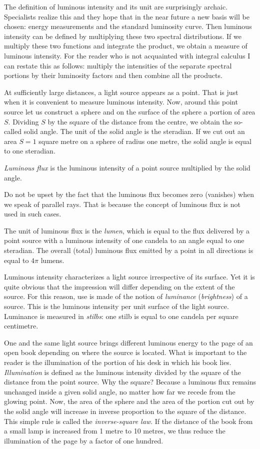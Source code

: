 The definition of luminous intensity and its unit are surprisingly archaic. Specialists realize this and they hope that in the near future a new basis will be chosen: energy measurements and the standard luminosity curve. Then luminous intensity can be defined by multiplying these two spectral distributions. If we multiply these two func­tions and integrate the product, we obtain a measure of luminous intensity. For the reader who is not acquainted with integral calculus I can restate this as follows: multiply the intensities of the separate spectral portions by their luminosity factors and then combine all the products.

At sufficiently large distances, a light source appears as a point. That is just when it is convenient to measure luminous intensity. Now, around this point source let us construct a sphere and on the surface of the sphere a portion of area $S$. Dividing $S$ by the square of the dis­tance from the centre, we obtain the so-called solid angle. The unit of the solid angle is the steradian. If we cut out an area $S= 1$ square metre on a sphere of radius one metre, the solid angle is equal to one 
steradian.

\emph{Luminous flux} is the luminous intensity of a point source multiplied by the solid angle.

Do not be upset by the fact that the luminous flux becomes zero (vanishes) when we speak of parallel rays. That is because the concept of luminous flux is not used in such cases.

The unit of luminous flux is the \emph{lumen}, which is equal to the flux delivered by a point source with a luminous intensity of one candela to an angle equal to one steradian. The overall (total) luminous flux emitted by a point in all directions is equal to $4\pi$ lumens.

Luminous intensity characterizes a light source irre­spective of its surface. Yet it is quite obvious that the impression will differ depending on the extent of the source.
For this reason, use is made of the notion of \emph{luminance} (\emph{brightness}) of a source. This is the luminous intensity per unit surface of the light source. Luminance is mea­sured in \emph{stilbs}: one stilb is equal to one candela per square centimetre.

One and the same light source brings different luminous energy to the page of an open book depending on where the source is located. What is important to the reader is the illumination of the portion of his desk in which his book lies. \emph{Illumination} is defined as the luminous intensi­ty divided by the square of the distance from the point source. Why the square? Because a luminous flux remains unchanged inside a given solid angle, no matter how far we recede from the glowing point. Now, the area of the sphere and the area of the portion cut out by the solid angle will increase in inverse proportion to the square of the distance. This simple rule is called the \emph{inverse-square law}. If the distance of the book from a small lamp is increased from 1 metre to 10 metres, we thus reduce the illumination of the page by a factor of one hundred. 

